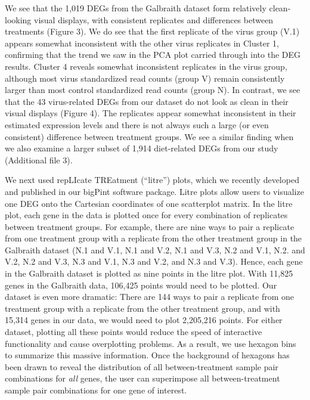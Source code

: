 \documentclass{bmcart}
\begin{document}
\begin{linenumbers}
\begin{doublespacing}
We see that the 1,019 DEGs from the Galbraith dataset form relatively clean-looking visual displays, with consistent replicates and differences between treatments (Figure 3). We do see that the first replicate of the virus group (V.1) appears somewhat inconsistent with the other virus replicates in Cluster 1, confirming that the trend we saw in the PCA plot carried through into the DEG results. Cluster 4 reveals somewhat inconsistent replicates in the virus group, although most virus standardized read counts (group V) remain consistently larger than most control standardized read counts (group N). In contrast, we see that the 43 virus-related DEGs from our dataset do not look as clean in their visual displays (Figure 4). The replicates appear somewhat inconsistent in their estimated expression levels and there is not always such a large (or even consistent) difference between treatment groups. We see a similar finding when we also examine a larger subset of 1,914 diet-related DEGs from our study (Additional file 3).

We next used repLIcate TREatment (``litre'') plots, which we recently developed and published in our bigPint software package. Litre plots allow users to visualize one DEG onto the Cartesian coordinates of one scatterplot matrix. In the litre plot, each gene in the data is plotted once for every combination of replicates between treatment groups. For example, there are nine ways to pair a replicate from one treatment group with a replicate from the other treatment group in the Galbraith dataset (N.1 and V.1, N.1 and V.2, N.1 and V.3, N.2 and V.1, N.2. and V.2, N.2 and V.3, N.3 and V.1, N.3 and V.2, and N.3 and V.3). Hence, each gene in the Galbraith dataset is plotted as nine points in the litre plot. With 11,825 genes in the Galbraith data, 106,425 points would need to be plotted. Our dataset is even more dramatic: There are 144 ways to pair a replicate from one treatment group with a replicate from the other treatment group, and with 15,314 genes in our data, we would need to plot 2,205,216 points. For either dataset, plotting all these points would reduce the speed of interactive functionality and cause overplotting problems. As a result, we use hexagon bins to summarize this massive information. Once the background of hexagons has been drawn to reveal the distribution of all between-treatment sample pair combinations for \textit{all} genes, the user can superimpose all between-treatment sample pair combinations for one gene of interest.


\end{doublespacing}
\end{linenumbers}
\end{document}

